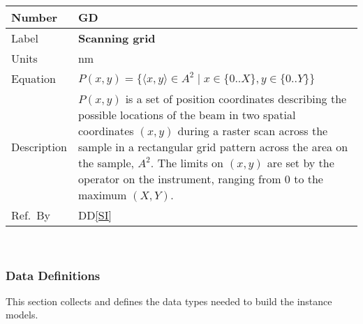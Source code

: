 \documentclass[12pt]{article}
\newcommand{\colAwidth}{0.13\textwidth}
\newcommand{\colBwidth}{0.82\textwidth}
\newcounter{defnum} %
\newcommand{\ddref}[1]{DD\ref{#1}}
\begin{document}
\noindent
\begin{minipage}{\textwidth}
	\renewcommand*{\arraystretch}{1.5}
	\begin{tabular}{| p{\colAwidth} | p{\colBwidth}|}
		\hline
		\rowcolor[gray]{0.9}
		Number& GD{defnum}\thedefnum \label{grid}\\
		\hline
		Label & \textbf{Scanning grid}  \\
		\hline
		Units& \si{\nano\metre}\\
		\hline
		Equation& $P(x,y) = \{\langle x, y \rangle \in A^2 \mid x \in \{0..X\}, y \in
\{0..Y\} \}$\\
		\hline
		Description & $P(x,y)$ is a set of position coordinates describing the
possible locations of the beam in two spatial coordinates $(x, y)$ during a
raster scan across the sample in a rectangular grid pattern across the area on
the sample, $A^2$. The limits on $(x,y)$ are set by the operator on the
instrument, ranging from 0 to the maximum $(X,Y)$.
		\\
		  \hline
		  Ref.\ By & \ddref{SI}\\
		  \hline
	\end{tabular}
\end{minipage}\\

\subsubsection{Data Definitions}\label{sec_datadef}

This section collects and defines the data types needed to build the instance
models.

~\newline
\end{document}
